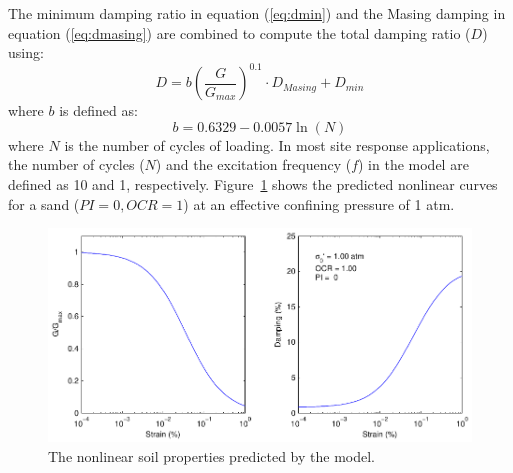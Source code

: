 \documentclass[12pt,oneside]{book}
\begin{document}
The minimum damping ratio in equation (\ref{eq:dmin}) and the Masing damping in equation
(\ref{eq:dmasing}) are combined to compute the total damping ratio ($D$) using:
\begin{equation}
    D = b  \left( \frac{G}{G_{max}} \right)^{0.1} \cdot D_{Masing} + D_{min} 
    \label{eq:damping}
\end{equation}
where $b$ is defined as:
\begin{equation}
    b = 0.6329 - 0.0057 \ln\left( N \right)
\end{equation}
where $N$ is the number of cycles of loading.  In most site response applications, the number of
cycles ($N$) and the excitation frequency ($f$) in the model are defined as 10 and 1,
respectively.  Figure~\ref{fig:siteResponse:nlEmpirical} shows the predicted nonlinear curves for a sand
($PI=0, OCR=1$) at an effective confining pressure of 1 atm.

\begin{figure}[tb]
    \begin{center}
        \includegraphics[width=\linewidth]{figures/siteResponse/nlEmpirical.pdf}
    \end{center}
    \caption{The nonlinear soil properties predicted by the \citet{darendeli:01} model.}
    \label{fig:siteResponse:nlEmpirical}
\end{figure}
\end{document}
